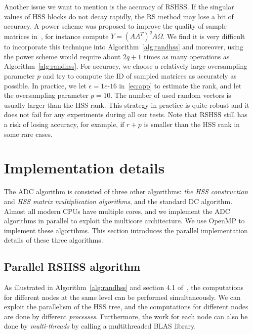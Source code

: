 \documentclass[times]{nlaauth}
\newcounter{algorithm}
\begin{document}
Another issue we want to mention is the accuracy of RSHSS.
If the singular values of HSS blocks do not decay rapidly, the RS
method may lose a bit of accuracy. A power scheme was proposed to improve the quality of sample matrices in~\cite{Martinsson-Rev10},
for instance compute $Y=(AA^T)^qA \Omega$.
We find it is very difficult to incorporate this technique into
Algorithm~\ref{alg:randhss} and moreover, using the power scheme would require about $2q+1$ times as many
operations as Algorithm~\ref{alg:randhss}.
For accuracy, we choose a relatively large oversampling parameter $p$ and try to compute the ID of sampled matrices
as accurately as possible.
In practice, we let $\epsilon=1e$-$16$ in~\eqref{eq:app} to estimate the rank, and let the oversampling
parameter $p=10$.
The number of used random vectors is usually larger than the
HSS rank.
This strategy in practice is quite robust and it does not fail for any experiments during all our tests.
Note that RSHSS still has a risk of losing accuracy, for example, if $r+p$ is smaller than the HSS rank in some rare cases.

\section{Implementation details}
\label{sec:impl}

The ADC algorithm is consisted of three other algorithms:
\emph{the HSS construction} and \emph{HSS matrix multiplication algorithms},
and the standard DC algorithm.
Almost all modern CPUs have multiple cores, and we implement the ADC algorithms
in parallel to exploit the multicore architecture.
We use OpenMP to implement these algortihms.
This section introduces the parallel implementation details of these three algorithms.


\subsection{Parallel RSHSS algorithm}

As illustrated in Algorithm~\ref{alg:randhss} and section 4.1 of~\cite{rand-hss}, the computations for
different nodes at the same level can be performed simultaneously.
We can exploit the parallelism of the HSS tree, and
the computations for different nodes are done by different \emph{processes}.
Furthermore, the work for each node can also be done by \emph{multi-threads} by calling
a multithreaded BLAS library.
\end{document}
